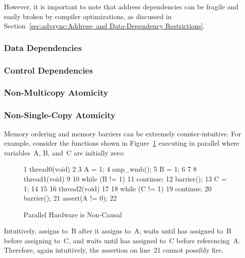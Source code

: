 However, it is important to note that address dependencies can
be fragile and easily broken by compiler optimizations, as discussed in
Section~\ref{sec:advsync:Address- and Data-Dependency Restrictions}.

\subsubsection{Data Dependencies}
\label{sec:advsync:Data Reordering}


\subsubsection{Control Dependencies}
\label{sec:advsync:Control Dependencies}

\subsubsection{Non-Multicopy Atomicity}
\label{sec:advsync:Non-Multicopy Atomicity}

\subsubsection{Non-Single-Copy Atomicity}
\label{sec:advsync:Non-Single-Copy Atomicity}

Memory ordering and memory barriers can be extremely counter-intuitive.
For example, consider the functions shown in
Figure~\ref{fig:advsync:Parallel Hardware is Non-Causal}
executing in parallel
where variables~A, B, and~C are initially zero:

\begin{figure}[tbp]
{ \scriptsize
\begin{verbbox}
  1 thread0(void)
  2 {
  3   A = 1;
  4   smp_wmb();
  5   B = 1;
  6 }
  7
  8 thread1(void)
  9 {
 10   while (B != 1)
 11     continue;
 12   barrier();
 13   C = 1;
 14 }
 15
 16 thread2(void)
 17 {
 18   while (C != 1)
 19     continue;
 20   barrier();
 21   assert(A != 0);
 22 }
\end{verbbox}
}
\centering
\theverbbox
\caption{Parallel Hardware is Non-Causal}
\label{fig:advsync:Parallel Hardware is Non-Causal}
\end{figure}

Intuitively,  assigns to~B after it assigns to~A,
 waits until  has assigned to~B before
assigning to~C, and  waits until  has
assigned to~C before referencing~A.
Therefore, again intuitively, the assertion on line~21 cannot possibly
fire.

